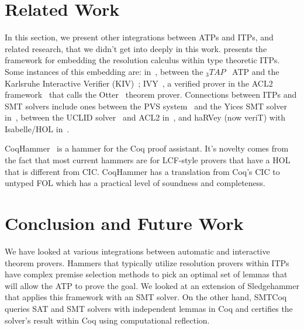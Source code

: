 \documentclass{article}
\begin{document}
\section{Related Work}
\label{sec:rel}
	In this section, we present other integrations 
	between ATPs and ITPs, and related research,  
	that we didn't get into deeply in this work. \cite{10.1007/10721959_10}
	presents the framework for embedding 
	the resolution calculus within type theoretic 
	ITPs. Some instances of this embedding 
	are: in~\cite{Ahrendt1998}, between the 
	$_{3}TAP$~\cite{10.5555/648232.753129} ATP 
	and the Karlsruhe Interactive Verifier 
	(KIV)~\cite{Reif1995}; 
	IVY~\cite{10.1007/10721959_30}, a verified 
	prover in the ACL2 
	framework~\cite{10.1007/978-3-540-71067-7_4} 
	that calls the 
	Otter~\cite{10.1023/A:1005843632307} theorem 
	prover. Connections between ITPs and SMT 
	solvers include ones between the PVS 
	system~\cite{10.1007/3-540-55602-8_217}
	and the Yices SMT solver
	in~\cite{1698746}, between the UCLID
	solver~\cite{10.1007/978-3-540-27813-9_40}
	and ACL2 in~\cite{DBLP:conf/iccad/ManoliosS05}, 
	and haRVey (now veriT) with Isabelle/HOL 
	in~\cite{10.1007/11691372_11}.

	CoqHammer~\cite{article} is a hammer for the 
	Coq proof assistant. It's novelty comes from 
	the fact that most current hammers are for 
	LCF-style provers that have a HOL that is 
	different from CIC. CoqHammer has a translation
	from Coq's CIC to untyped FOL which has a 
	practical level of soundness and completeness.


\section{Conclusion and Future Work}
\label{sec:conc}
	We have looked at various integrations between 
	automatic and interactive theorem provers.
	Hammers that typically utilize resolution 
	provers within ITPs have complex premise 
	selection methods to pick an optimal set 
	of lemmas that will allow the ATP to prove 
	the goal. We looked at an extension of 
	Sledgehammer that applies this framework 
	with an SMT solver. On the other hand, 
	SMTCoq queries SAT and SMT solvers with 
	independent lemmas in Coq and certifies the 
	solver's result within Coq using computational
	reflection. 
	
\end{document}

